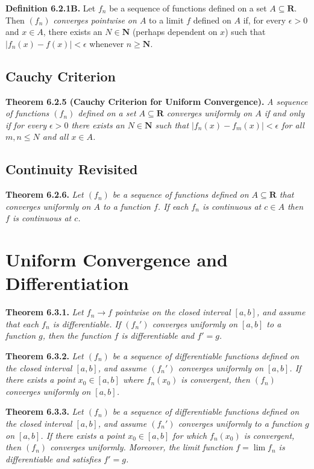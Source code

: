\documentclass[12pt]{report}
\newcommand{\R}{\textbf{R}}
\newcommand{\N}{\textbf{N}}
\begin{document}
\noindent \textbf{Definition 6.2.1B.} Let $f_n$ be a sequence of functions defined on a set $A\subseteq\R$. Then $(f_n)$ \textit{converges pointwise on $A$} to a limit $f$ defined on $A$ if, for every $\epsilon>0$ and $x\in A$, there exists an $N\in\N$ (perhaps dependent on $x$) such that $|f_n(x)-f(x)|<\epsilon$ whenever $n\geq\N$.
\bigskip

\subsection*{Cauchy Criterion}

\noindent \textbf{Theorem 6.2.5 (Cauchy Criterion for Uniform Convergence).} \textit{A sequence of functions $(f_n)$ defined on a set $A\subseteq\R$ converges uniformly on $A$ if and only if for every $\epsilon>0$ there exists an $N\in\N$ such that $|f_n(x)-f_m(x)|<\epsilon$ for all $m,n\leq N$ and all $x\in A$.}
\bigskip

\subsection*{Continuity Revisited}

\noindent \textbf{Theorem 6.2.6.} \textit{Let $(f_n)$ be a sequence of functions defined on $A\subseteq\R$ that converges uniformly on $A$ to a function $f$. If each $f_n$ is continuous at $c\in A$ then $f$ is continuous at $c$.}
\bigskip

\section{Uniform Convergence and Differentiation}

\noindent \textbf{Theorem 6.3.1.} \textit{Let $f_n\rightarrow f$ pointwise on the closed interval $[a,b]$, and assume that each $f_n$ is differentiable.  If $(f_n')$ converges uniformly on $[a,b]$ to a function $g$, then the function $f$ is differentiable and $f'=g$.}
\bigskip

\noindent \textbf{Theorem 6.3.2.} \textit{Let $(f_n)$ be a sequence of differentiable functions defined on the closed interval $[a,b]$, and assume $(f_n')$ converges uniformly on $[a,b]$.  If there exists a point $x_0\in[a,b]$ where $f_n(x_0)$ is convergent, then $(f_n)$ converges uniformly on $[a,b]$.}
\bigskip

\noindent \textbf{Theorem 6.3.3.} \textit{Let $(f_n)$ be a sequence of differentiable functions defined on the closed interval $[a,b]$, and assume $(f_n')$ converges uniformly to a function $g$ on $[a,b]$.  If there exists a point $x_0\in[a,b]$ for which $f_n(x_0)$ is convergent, then $(f_n)$ converges uniformly.  Moreover, the limit function $f=\lim f_n$ is differentiable and satisfies $f'=g$.}
\bigskip
\end{document}
